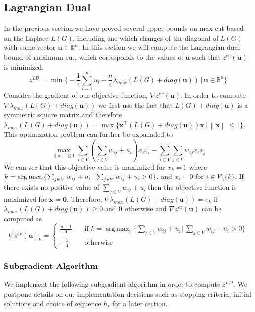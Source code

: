 \documentclass[12pt]{article}
\theoremstyle{plain}
\theoremstyle{definition}
\DeclareMathOperator*{\argmax}{arg\,max}
\newcommand{\norm}[1]{\left\lVert#1\right\rVert}
\begin{document}
\subsection{Lagrangian Dual}\label{subsec:LDbound}

In the previous section we have proved several upper bounds on max cut based on the Laplace $L(G)$, including one which changes of the diagonal of $L(G)$ with some vector $\mathbf{u} \in \mathbb{R}^n$. In this section we will
compute the Lagrangian dual bound of maximum cut, which corresponds to the values of $\mathbf{u}$ such that $z^{ev}(\mathbf{u})$ is minimized.
\[
    z^{LD} = \min\Bigg\lbrace -\frac{1}{4}\sum_{i=1}^n u_i + \dfrac{n}{4} \lambda_{max}(L(G) + diag(\mathbf{u})) \,\Bigg|\, \mathbf{u} \in \mathbb{R}^n \Bigg\rbrace
\]
Consider the gradient of our objective function, $\nabla z^{ev}(\mathbf{u})$. In order to compute $\nabla \lambda_{max}(L(G) + diag(\mathbf{u}))$ we first use the fact that $L(G) + diag(\mathbf{u})$ is a symmetric square matrix and therefore $\lambda_{max}(L(G) + diag(\mathbf{u})) = \max\lbrace \mathbf{x}^\top (L(G) + diag(\mathbf{u})) \mathbf{x} \,|\,\norm{\mathbf{x}} \leq 1\rbrace$. This optimization problem can further be expanaded to
\[
\max_{\norm{\mathbf{x}} \leq 1} \sum_{i \in V} \left(\sum_{j \in V} w_{ij} + u_i \right) x_i x_i - \sum_{i \in V} \sum_{j\in V} w_{ij}x_i x_j 
\]
We can see that this objective value is maximized for $x_k = 1$ where $k = \argmax_i\large\lbrace \sum_{j \in V} w_{ij} + u_i \, |\, \sum_{j \in V} w_{ij} + u_i  > 0\large\rbrace$, and $x_i = 0$ for $i \in V \setminus \lbrace k \rbrace$. If there exists no positive value of  $\sum_{j \in V} w_{ij} + u_i $ then the objective function is maximized for $\mathbf{x} = \mathbf{0}$. Therefore, $\nabla \lambda_{max}(L(G) + diag(\mathbf{u})) = e_k$ if $ \lambda_{max}(L(G) + diag(\mathbf{u}))  \geq 0$ and $\mathbf{0}$ otherwise and  $\nabla z^{ev}(\mathbf{u})$ can be computed as
\[
 \nabla z^{ev}(\mathbf{u})_k = \begin{cases}
 \frac{n-1}{4} \quad& \text{if }k =\argmax_i\Big\lbrace \sum_{j \in V} w_{ij} + u_i  \,\Big|\, \sum_{j \in V} w_{ij} + u_i  > 0\Big\rbrace\\
 -\frac{1}{4} \quad&\text{otherwise}
 \end{cases}
\]
\subsubsection{Subgradient Algorithm}\label{subsubsec:Subgradient}

We implement the following subgradient algorithm in order to compute $z^{LD}$. We postpone details on our implementation decisions such as stopping criteria, initial solutions and choice of sequence $h_k$ for a later section.
\end{document}
